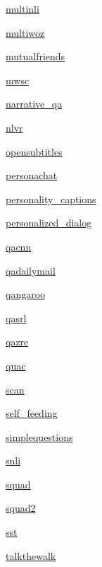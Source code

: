 \begin{DoxyCompactItemize}
\item 
 \hyperlink{namespaceparlai_1_1tasks_1_1multinli}{multinli}
\item 
 \hyperlink{namespaceparlai_1_1tasks_1_1multiwoz}{multiwoz}
\item 
 \hyperlink{namespaceparlai_1_1tasks_1_1mutualfriends}{mutualfriends}
\item 
 \hyperlink{namespaceparlai_1_1tasks_1_1mwsc}{mwsc}
\item 
 \hyperlink{namespaceparlai_1_1tasks_1_1narrative__qa}{narrative\+\_\+qa}
\item 
 \hyperlink{namespaceparlai_1_1tasks_1_1nlvr}{nlvr}
\item 
 \hyperlink{namespaceparlai_1_1tasks_1_1opensubtitles}{opensubtitles}
\item 
 \hyperlink{namespaceparlai_1_1tasks_1_1personachat}{personachat}
\item 
 \hyperlink{namespaceparlai_1_1tasks_1_1personality__captions}{personality\+\_\+captions}
\item 
 \hyperlink{namespaceparlai_1_1tasks_1_1personalized__dialog}{personalized\+\_\+dialog}
\item 
 \hyperlink{namespaceparlai_1_1tasks_1_1qacnn}{qacnn}
\item 
 \hyperlink{namespaceparlai_1_1tasks_1_1qadailymail}{qadailymail}
\item 
 \hyperlink{namespaceparlai_1_1tasks_1_1qangaroo}{qangaroo}
\item 
 \hyperlink{namespaceparlai_1_1tasks_1_1qasrl}{qasrl}
\item 
 \hyperlink{namespaceparlai_1_1tasks_1_1qazre}{qazre}
\item 
 \hyperlink{namespaceparlai_1_1tasks_1_1quac}{quac}
\item 
 \hyperlink{namespaceparlai_1_1tasks_1_1scan}{scan}
\item 
 \hyperlink{namespaceparlai_1_1tasks_1_1self__feeding}{self\+\_\+feeding}
\item 
 \hyperlink{namespaceparlai_1_1tasks_1_1simplequestions}{simplequestions}
\item 
 \hyperlink{namespaceparlai_1_1tasks_1_1snli}{snli}
\item 
 \hyperlink{namespaceparlai_1_1tasks_1_1squad}{squad}
\item 
 \hyperlink{namespaceparlai_1_1tasks_1_1squad2}{squad2}
\item 
 \hyperlink{namespaceparlai_1_1tasks_1_1sst}{sst}
\item 
 \hyperlink{namespaceparlai_1_1tasks_1_1talkthewalk}{talkthewalk}

\end{DoxyCompactItemize}
